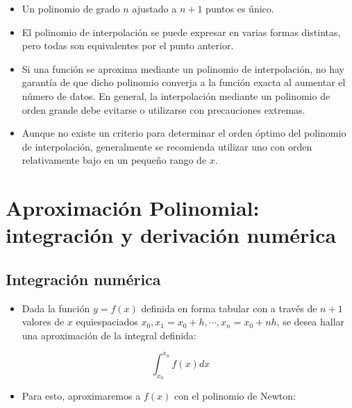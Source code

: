 \documentclass[openany]{book}
\providecommand{\tightlist}{%
  \setlength{\itemsep}{0pt}\setlength{\parskip}{0pt}}
\begin{document}
\begin{itemize}
\tightlist
\item
  Un polinomio de grado \(n\) ajustado a \(n+1\) puntos es único.
\item
  El polinomio de interpolación se puede expresar en varias formas distintas, pero todas son equivalentes por el punto anterior.
\item
  Si una función se aproxima mediante un polinomio de interpolación, no hay garantía de que dicho polinomio converja a la función exacta al aumentar el número de datos. En general, la interpolación mediante un polinomio de orden grande debe evitarse o utilizarse con precauciones extremas.
\item
  Aunque no existe un criterio para determinar el orden óptimo del polinomio de interpolación, generalmente se recomienda utilizar uno con orden relativamente bajo en un pequeño rango de \(x\).
\end{itemize}

\hypertarget{aproximaciuxf3n-polinomial-integraciuxf3n-y-derivaciuxf3n-numuxe9rica}{%
\chapter{Aproximación Polinomial: integración y derivación numérica}\label{aproximaciuxf3n-polinomial-integraciuxf3n-y-derivaciuxf3n-numuxe9rica}}

\hypertarget{integraciuxf3n-numuxe9rica}{%
\section{Integración numérica}\label{integraciuxf3n-numuxe9rica}}

\begin{itemize}
\tightlist
\item
  Dada la función \(y = f(x)\) definida en forma tabular con a través de \(n+1\) valores de \(x\) equiespaciados \(x_0, x_1 = x_0 + h, \cdots, x_n = x_0 + nh\), se desea hallar una aproximación de la integral definida:
\end{itemize}

\begin{equation}
\label{eq:ec1}
\int_{x_0}^{x_n} f(x)dx
\end{equation}

\begin{itemize}
\tightlist
\item
  Para esto, aproximaremos a \(f(x)\) con el polinomio de Newton:
\end{itemize}
\end{document}
